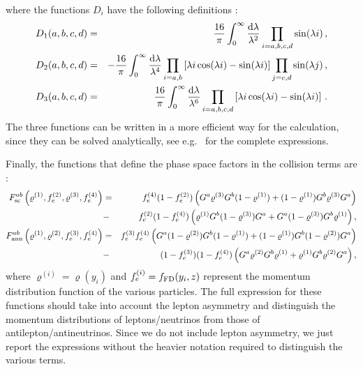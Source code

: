 \documentclass[notitlepage,showpacs,preprintnumbers,amsmath,amssymb,superscriptaddress,prd,onecolumn]{revtex4-1}
\begin{document}
%
where the functions $D_i$ have the following definitions \cite{Dolgov:1997mb}:
%
\begin{eqnarray}
D_1(a,b,c,d)
&=&
\frac{16}{\pi}
\int_0^\infty
\frac{{\rm d}\lambda}{\lambda^2}
\prod_{i=a,b,c,d}\sin(\lambda i)
\,,\\
D_2(a,b,c,d)
&=&
-\frac{16}{\pi}
\int_0^\infty
\frac{{\rm d}\lambda}{\lambda^4}
\prod_{i=a,b}\left[\lambda i \cos(\lambda i)-\sin(\lambda i)\right]
\prod_{j=c,d}\sin(\lambda j)
\,,\\
D_3(a,b,c,d)
&=&
\frac{16}{\pi}
\int_0^\infty
\frac{\mathrm{d}\lambda}{\lambda^6}
\prod_{i=a,b,c,d}\left[\lambda i \cos(\lambda i)-\sin(\lambda i)\right]
\,.
\end{eqnarray}
The three functions can be written in a more efficient way for the calculation,
since they can be solved analytically, see e.g.~\cite{Blaschke:2016xxt} for the complete expressions.

Finally, the functions that define the phase space factors in the collision terms are \cite{deSalas:2016ztq}:
\begin{eqnarray}
F_{\rm sc}^{ab}\left(\varrho^{(1)}, f_e^{(2)}, \varrho^{(3)}, f_e^{(4)}\right)
&=&
f_e^{(4)}(1-f_e^{(2)})\left(G^a\varrho^{(3)}G^b(1-\varrho^{(1)})+(1-\varrho^{(1)})G^b\varrho^{(3)}G^a\right)
\nonumber\\
&-&
f_e^{(2)}(1-f_e^{(4)})\left(\varrho^{(1)}G^b(1-\varrho^{(3)})G^a+G^a(1-\varrho^{(3)})G^b\varrho^{(1)}\right),
\label{eq:F_ab_sc}\\
F_{\rm ann}^{ab}\left(\varrho^{(1)}, \varrho^{(2)}, f_e^{(3)}, f_e^{(4)}\right)
&=&
f_e^{(3)}f_e^{(4)}\left(G^a(1-\varrho^{(2)})G^b(1-\varrho^{(1)})+(1-\varrho^{(1)})G^b(1-\varrho^{(2)})G^a\right)
\nonumber\\
&-&
(1-f_e^{(3)})(1-f_e^{(4)})\left(G^a\varrho^{(2)}G^b\varrho^{(1)}+\varrho^{(1)}G^b\varrho^{(2)}G^a\right),
\label{eq:F_ab_ann}
\end{eqnarray}
where $\varrho^{(i)}=\varrho(y_i)$ and $f_e^{(i)}=f_{\rm FD}(y_i, z)$ represent the momentum distribution function
of the various particles.
The full expression for these functions should take into account the lepton asymmetry and distinguish
the momentum distributions of leptons/neutrinos from those of antilepton/antineutrinos.
Since we do not include lepton asymmetry, we just report the expressions without the heavier notation
required to distinguish the various terms.
\end{document}
